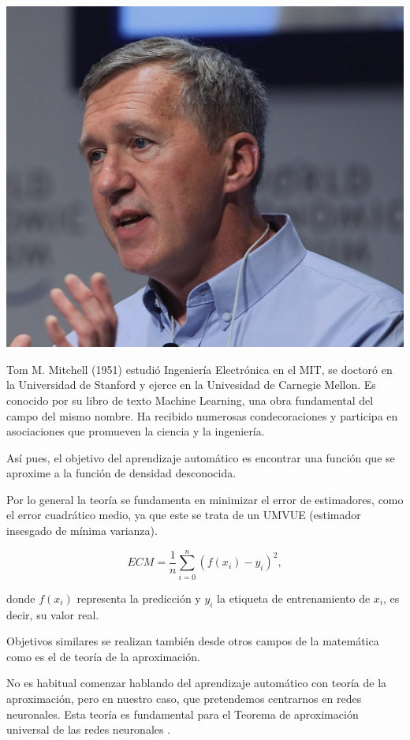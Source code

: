 \documentclass[11pt,twoside,titlepage,a4paper]{article}
\numberwithin{equation}{section} %
\theoremstyle{usual}
\begin{document}
\begin{marginfigure}
    \includegraphics[width=\marginparwidth]{Source/images/tom_mitchell.jpg}
    \caption{Tom M. Mitchell (1951) estudió Ingeniería Electrónica en el MIT, se doctoró en la Universidad de Stanford y ejerce en la Univesidad de Carnegie Mellon. Es conocido por su libro de texto Machine Learning, una obra fundamental del campo del mismo nombre. Ha recibido numerosas condecoraciones y participa en asociaciones que promueven la ciencia y la ingeniería.}
\end{marginfigure}

Así pues, el objetivo del aprendizaje automático es encontrar una función que se aproxime a la función de densidad desconocida.

Por lo general la teoría se fundamenta en minimizar el error de estimadores, como el error cuadrático medio, ya que este se trata de un UMVUE  (estimador insesgado de mínima varianza). 

\begin{equation}
ECM = \frac{1}{n} \sum_{i=0} ^n (f(x_i) - y_i)^2,    
\end{equation}

donde $f(x_i)$ representa la predicción y $y_i$ la etiqueta de entrenamiento de $x_i$, es decir, su valor real. 

Objetivos similares se realizan también desde otros campos de la matemática como es el de teoría de la aproximación. 

No es habitual comenzar hablando del aprendizaje automático con teoría de la aproximación, pero en nuestro caso, que pretendemos centrarnos en redes neuronales. Esta teoría es fundamental para el Teorema de aproximación universal de las redes neuronales \cite{historia-aproximacion}.
\end{document}
